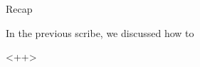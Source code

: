 \documentclass{article}
\begin{document}
\makeheader%

\begin{ssection}{Recap}

	In the previous scribe, we discussed how to 

\end{ssection}<++>
\end{document}
